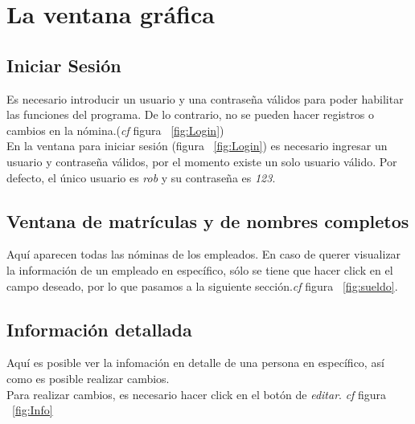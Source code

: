 \documentclass[12pt]{amsart}
\begin{document}
\section{La ventana gr\'afica}
\subsection{Iniciar Sesi\'on}
{Es necesario introducir un usuario y una contrase\~na v\'alidos para poder habilitar las funciones del programa. De lo contrario, no se pueden hacer registros o cambios en la n\'omina.(\textit{cf} figura ~\ref{fig:Login})}\\
{En la ventana para iniciar sesi\'on (figura ~\ref{fig:Login}) es necesario ingresar un usuario y contrase\~na v\'alidos, por el momento existe un solo usuario v\'alido. Por defecto, el \'unico usuario es \textit{rob} y su contrase\~na es \textit{123}.}

\subsection{Ventana de matr\'iculas y de nombres completos}
{Aqu\'i aparecen todas las n\'ominas de los empleados. En caso de querer visualizar la informaci\'on de un empleado en espec\'ifico, s\'olo se tiene que hacer click en el campo deseado, por lo que pasamos a la siguiente secci\'on.\textit{cf} figura ~\ref{fig:sueldo}.}

\subsection{Informaci\'on detallada}
{Aqu\'i es posible ver la infomaci\'on en detalle de una persona en espec\'ifico, as\'i como es posible realizar cambios.}\\
{Para realizar cambios, es necesario hacer click en el bot\'on de \textit{editar}. \textit{cf} figura ~\ref{fig:Info} }\\\\\\\\\\\\\\\\\\\\\\
\end{document}
